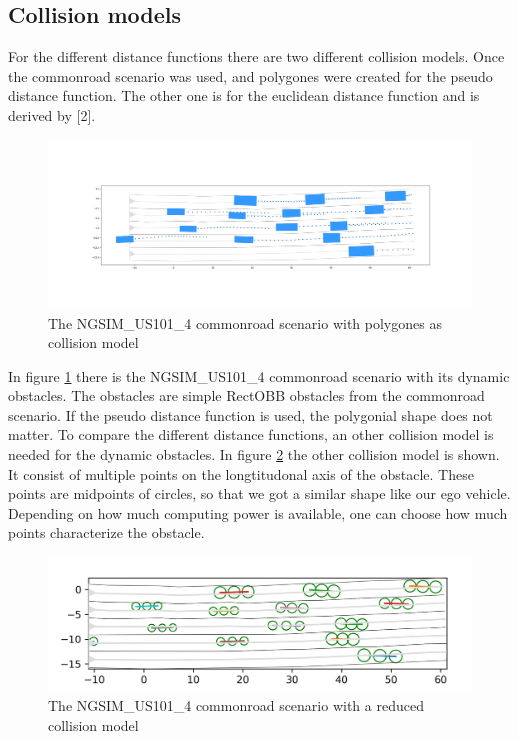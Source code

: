 \documentclass[conference]{IEEEtran}
\begin{document}
\subsection{Collision models}
For the different distance functions there are two different collision models.
Once the commonroad scenario was used, and polygones were created for the pseudo distance function.
The other one is for the euclidean distance function and is derived by [2].
\begin{figure}[h]
\begin{center}
\includegraphics[scale = 0.16]{commonroadUS4.png}
\end{center}
\caption{The NGSIM\_US101\_4 commonroad scenario with polygones as collision model}
\label{us4}
\end{figure}
In figure \ref{us4} there is the NGSIM\_US101\_4 commonroad scenario with its dynamic obstacles. The obstacles are simple RectOBB obstacles from the commonroad scenario. If the pseudo distance function is used, the polygonial shape does not matter. To compare the different distance functions, an other collision model is needed for the dynamic obstacles. In figure \ref{newcm} the other collision model is shown. It consist of multiple points on the longtitudonal axis of the obstacle. These points are midpoints of circles, so that we got a similar shape like our ego vehicle. Depending on how much computing power is available, one can choose how much points characterize the obstacle.
\begin{figure}[h]
\begin{center}
\includegraphics[scale = 0.6]{newcollision.png}
\end{center}
\caption{The NGSIM\_US101\_4 commonroad scenario with a reduced collision model}
\label{newcm}
\end{figure}
\end{document}
